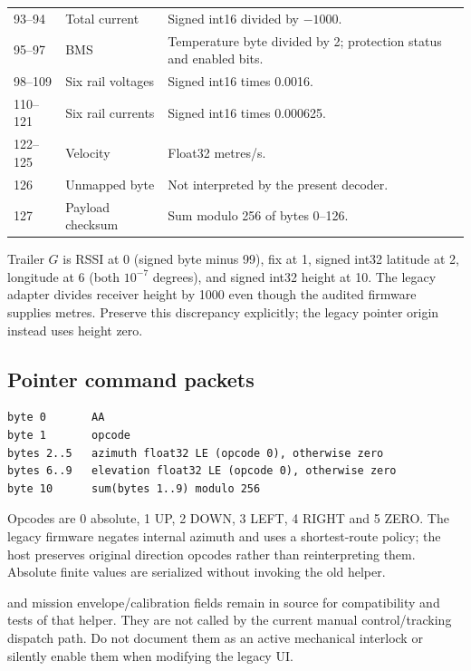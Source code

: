 \begin{longtable}{@{}L{.14\linewidth}L{.31\linewidth}L{.48\linewidth}@{}}
93--94 & Total current & Signed int16 divided by $-1000$. \\
95--97 & BMS & Temperature byte divided by 2; protection status and enabled bits. \\
98--109 & Six rail voltages & Signed int16 times 0.0016. \\
110--121 & Six rail currents & Signed int16 times 0.000625. \\
122--125 & Velocity & Float32 metres/s. \\
126 & Unmapped byte & Not interpreted by the present decoder. \\
127 & Payload checksum & Sum modulo 256 of bytes 0--126. \\
\bottomrule
\end{longtable}
Trailer \(G\) is RSSI at 0 (signed byte minus 99), fix at 1, signed int32
latitude at 2, longitude at 6 (both \(10^{-7}\) degrees), and signed int32
height at 10. The legacy adapter divides receiver height by 1000 even though the
audited firmware supplies metres. Preserve this discrepancy explicitly; the
legacy pointer origin instead uses height zero.


\subsection{Pointer command packets}
\begin{lstlisting}
byte 0       AA
byte 1       opcode
bytes 2..5   azimuth float32 LE (opcode 0), otherwise zero
bytes 6..9   elevation float32 LE (opcode 0), otherwise zero
byte 10      sum(bytes 1..9) modulo 256
\end{lstlisting}
Opcodes are 0 absolute, 1 UP, 2 DOWN, 3 LEFT, 4 RIGHT and 5 ZERO.
The legacy firmware negates internal azimuth and uses a shortest-route policy;
the host preserves original direction opcodes rather than reinterpreting them.
Absolute finite values are serialized without invoking the old
 helper.

 and mission envelope/calibration fields remain in source
for compatibility and tests of that helper. They are not called by the current
manual control/tracking dispatch path. Do not document them as an active
mechanical interlock or silently enable them when modifying the legacy UI.

